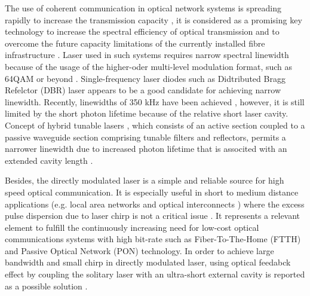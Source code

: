 The use of coherent communication in optical network systems is spreading rapidly to increase the transmission capacity \cite{ishii2017narrow}, it is considered as a promising key technology to increase the spectral efficiency of optical transmission and to overcome the future capacity limitations of the currently installed fibre infrastructure \cite{seimetz2008laser}. Laser used in such systems requires narrow spectral linewidth because of the usage of the higher-oder multi-level modulation format, such as 64QAM or beyond \cite{seimetz2008laser}. Single-frequency laser diodes such as Didtributed Bragg Refelctor (DBR) laser appears to be a good candidate for achieving narrow linewidth. Recently, linewidths of 350 kHz have been achieved \cite{de2016hybrid}, however, it is still limited by the short photon lifetime because of the relative short laser cavity. 
Concept of hybrid tunable lasers \cite{fan2017spectral}, which consists of an active section coupled to a passive waveguide section comprising tunable filters and reflectors, permits a narrower linewidth due to increased photon lifetime that is associted with an extended cavity length \cite{henry1982theory}.


Besides, the directly modulated laser is a simple and reliable source for high speed optical communication. It is especially useful in short to medium distance applications (e.g. local area networks \cite{zhang2012next} and optical interconnects \cite{taubenblatt2012optical}) where the excess pulse dispersion due to laser chirp is not a critical issue \cite{soriano2013complex}. It represents a relevant element to fulfill the continuously increasing need for low-cost optical communications systems with high bit-rate such as Fiber-To-The-Home (FTTH) \cite{cartaxo2011perspective, khanaa2013performance} and Passive Optical Network (PON) \cite{urata2012high, kani2010enabling} technology. In order to achieve large bandwidth and small chirp in directly modulated laser, using optical feedabck effect by coupling the solitary laser with an ultra-short external cavity is reported as a possible solution \cite{ahmed2016modulation, mieda2016ultra, choi2015evaluation}. 



